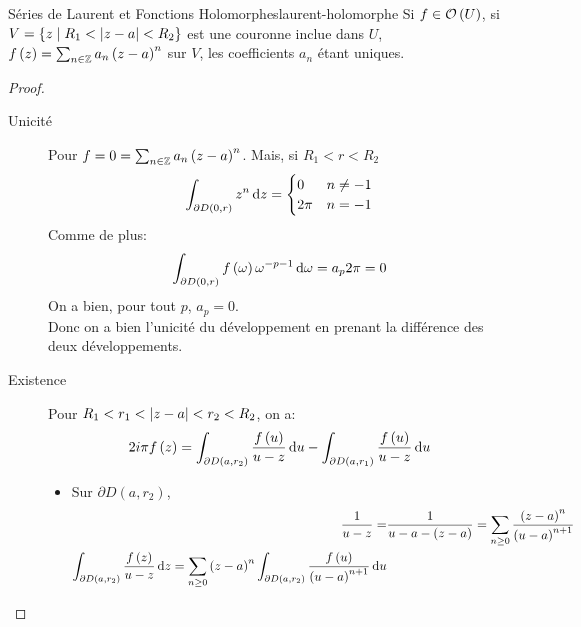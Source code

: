 \documentclass{cours}
\begin{document}
\begin{théorème}
	{Séries de Laurent et Fonctions Holomorphes}{laurent-holomorphe}
	Si $f \in \mathcal{O}\left(U\right)$, si $V = \left\{z \mid R_{1} < \left|z - a\right| < R_{2}\right\}$ est une couronne inclue dans $U$, $f\left(z\right) = \sum_{n \in \mathbb{Z}} a_{n}\left(z - a\right)^{n}$ sur $V$, les coefficients $a_{n}$ étant uniques. 
\end{théorème}
\begin{proof}
	\begin{description}
		\item[Unicité] Pour $f = 0 = \sum_{n \in \mathbb{Z}} a_{n}\left(z - a\right)^{n}$. 
			Mais, si $R_{1}  < r < R_{2}$
			\begin{equation*}
				\int_{\partial D\left(0, r\right)}z^{n}{\rm \, d} z = \begin{cases}
					0 & n \neq -1\\ 2\pi & n = - 1
				\end{cases}
			\end{equation*}
			Comme de plus: 
			\begin{equation*}
				\int_{\partial D\left(0, r\right)}f\left(\omega\right)\omega^{- p - 1}{\rm \, d} \omega = a_{p}2\pi = 0
			\end{equation*}
			On a bien, pour tout $p$, $a_{p} = 0$.\\
			Donc on a bien l'unicité du développement en prenant la différence des deux développements.
		\item[Existence] Pour $R_{1} < r_1 < \left|z - a\right| < r_{2} < R_{2}$, on a: 
			\begin{equation*}
				2i\pi f\left(z\right) = \int_{\partial D\left(a, r_{2}\right)}\frac{f\left(u\right)}{u - z}{\rm \, d} u - \int_{\partial D\left(a, r_{1}\right)} \frac{f\left(u\right)}{u - z} {\rm \, d} u
			\end{equation*}
			\begin{itemize}
				\item Sur $\partial D\left(a, r_{2}\right)$, \begin{equation*}
						\begin{aligned}
							\frac{1}{u - z} =& \frac{1}{u - a - \left(z - a\right)} = \sum_{n \geq 0}\frac{\left(z - a\right)^{n}}{\left(u - a\right)^{n + 1}}\\
								\int_{\partial D\left(a, r_{2}\right)} \frac{f\left(z\right)}{u - z} {\rm \, d} z = \sum_{n \geq 0} \left(z - a\right)^{n}\int_{\partial D\left(a, r_{2}\right)} \frac{f\left(u\right)}{\left(u-a\right)^{n + 1}}{\rm \, d} u
						\end{aligned}
					\end{equation*}

\end{itemize}
\end{description}
\end{proof}
\end{document}
